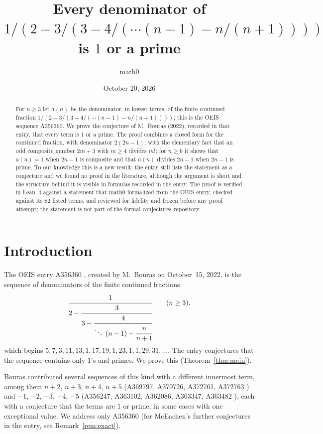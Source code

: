 \documentclass[11pt]{amsart}
\title[Denominators of a continued fraction (OEIS A356360)]{Every denominator of $1/(2-3/(3-4/(\cdots(n-1)-n/(n+1))))$ is $1$ or a prime}
\author{math0}
\date{October 20, 2026}
\theoremstyle{plain}
\theoremstyle{definition}
\begin{document}
\begin{abstract}
For $n\ge3$ let $a(n)$ be the denominator, in lowest terms, of the finite continued fraction $1/(2-3/(3-4/(\cdots(n-1)-n/(n+1))))$; this is the OEIS sequence A356360.
We prove the conjecture of M.~Bouras (2022), recorded in that entry, that every term is $1$ or a prime.
The proof combines a closed form for the continued fraction, with denominator $2(2n-1)$, with the elementary fact that an odd composite number $2m+3$ with $m\ge4$ divides $m!$; for $n\ge6$ it shows that $a(n)=1$ when $2n-1$ is composite and that $a(n)$ divides $2n-1$ when $2n-1$ is prime.
To our knowledge this is a new result: the entry still lists the statement as a conjecture and we found no proof in the literature, although the argument is short and the structure behind it is visible in formulas recorded in the entry.
The proof is verified in Lean~4 against a statement that math0 formalized from the OEIS entry, checked against its $82$ listed terms, and reviewed for fidelity and frozen before any proof attempt; the statement is not part of the formal-conjectures repository.
\end{abstract}
\maketitle

\section{Introduction}

The OEIS entry A356360 \cite{A356360}, created by M.~Bouras on October~15, 2022, is the sequence of denominators of the finite continued fractions
\[
  \cfrac{1}{2-\cfrac{3}{3-\cfrac{4}{\ddots\;(n-1)-\cfrac{n}{n+1}}}}\qquad(n\ge3),
\]
which begins $5,7,3,11,13,1,17,19,1,23,1,1,29,31,\dots$. The entry conjectures that the sequence contains only $1$'s and primes. We prove this (Theorem~\ref{thm:main}).

Bouras contributed several sequences of this kind with a different innermost term, among them $n+2$, $n+3$, $n+4$, $n+5$ (A369797, A370726, A372761, A372763 \cite{A369797,A370726,A372761,A372763}) and $-1$, $-2$, $-3$, $-4$, $-5$ (A356247, A363102, A362086, A363347, A363482 \cite{A356247,A363102,A362086,A363347,A363482}), each with a conjecture that the terms are $1$ or prime, in some cases with one exceptional value. We address only A356360 (for McEachen's further conjectures in the entry, see Remark~\ref{rem:exact}).
\end{document}
